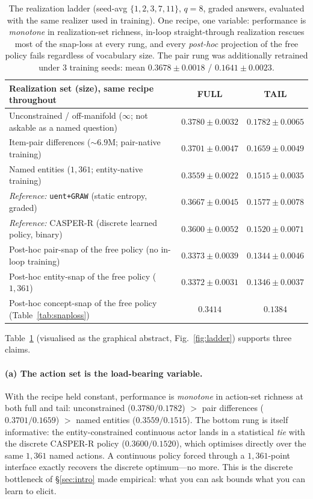 \documentclass[11pt]{article}
\begin{document}
\begin{table}[h]\centering
\begin{tabular}{lcc}
\toprule
Realization set (size), same recipe throughout & FULL & TAIL \\
\midrule
Unconstrained / off-manifold ($\infty$; not askable as a named question) & $0.3780\pm0.0032$ & $0.1782\pm0.0065$ \\
Item-pair differences (${\sim}6.9$M; pair-native training) & $0.3701\pm0.0047$ & $0.1659\pm0.0049$ \\
Named entities ($1{,}361$; entity-native training) & $0.3559\pm0.0022$ & $0.1515\pm0.0035$ \\
\midrule
\emph{Reference:} \texttt{uent+GRAW} (static entropy, graded) & $0.3667\pm0.0045$ & $0.1577\pm0.0078$ \\
\emph{Reference:} CASPER-R (discrete learned policy, binary) & $0.3600\pm0.0052$ & $0.1520\pm0.0071$ \\
\midrule
Post-hoc pair-snap of the free policy (no in-loop training) & $0.3373\pm0.0039$ & $0.1344\pm0.0046$ \\
Post-hoc entity-snap of the free policy ($1{,}361$) & $0.3372\pm0.0031$ & $0.1346\pm0.0037$ \\
Post-hoc concept-snap of the free policy (Table~\ref{tab:snaploss}) & $0.3414$ & $0.1384$ \\
\bottomrule
\end{tabular}
\caption{The realization ladder (seed-avg $\{1,2,3,7,11\}$, $q{=}8$, graded answers, evaluated with the same realizer
used in training). One recipe, one variable: performance is \emph{monotone} in realization-set richness, in-loop
straight-through realization rescues most of the snap-loss at every rung, and every \emph{post-hoc} projection of the
free policy fails regardless of vocabulary size. The pair rung was additionally retrained under $3$ training seeds:
mean $0.3678\pm0.0018$ / $0.1641\pm0.0023$.}\label{tab:ladder}
\end{table}

Table~\ref{tab:ladder} (visualised as the graphical abstract, Fig.~\ref{fig:ladder}) supports three claims.

\paragraph{(a) The action set is the load-bearing variable.} With the recipe held constant, performance is
\emph{monotone} in action-set richness at both full and tail: unconstrained ($0.3780/0.1782$) $>$ pair differences
($0.3701/0.1659$) $>$ named entities ($0.3559/0.1515$). The bottom rung is itself informative: the entity-constrained
continuous actor lands in a statistical \emph{tie} with the discrete CASPER-R policy ($0.3600/0.1520$), which optimises
directly over the same $1{,}361$ named actions. A continuous policy forced through a $1{,}361$-point interface exactly
recovers the discrete optimum---no more. This is the discrete bottleneck of \S\ref{sec:intro} made empirical: what you
can ask bounds what you can learn to elicit.
\end{document}
